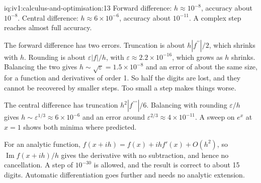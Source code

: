 \begin{solution}{iq:iv1:calculus-and-optimisation:13}
Forward difference: $h \approx 10^{-8}$, accuracy about $10^{-8}$. Central difference: $h \approx 6 \times 10^{-6}$, accuracy about $10^{-11}$. A complex step reaches almost full accuracy.

The forward difference has two errors. Truncation is about $h|f^{\prime\prime}|/2$, which shrinks with $h$. Rounding is about $\varepsilon|f|/h$, with $\varepsilon \approx 2.2 \times 10^{-16}$, which grows as $h$ shrinks. Balancing the two gives $h \sim \sqrt{\varepsilon} = 1.5 \times 10^{-8}$ and an error of about the same size, for a function and derivatives of order 1. So half the digits are lost, and they cannot be recovered by smaller steps. Too small a step makes things worse.

The central difference has truncation $h^2|f^{\prime\prime\prime}|/6$. Balancing with rounding $\varepsilon/h$ gives $h \sim \varepsilon^{1/3} \approx 6 \times 10^{-6}$ and an error around $\varepsilon^{2/3} \approx 4 \times 10^{-11}$. A sweep on $e^x$ at $x = 1$ shows both minima where predicted.

For an analytic function, $f(x + ih) = f(x) + ihf'(x) + O(h^2)$, so $\operatorname{Im} f(x + ih)/h$ gives the derivative with no subtraction, and hence no cancellation. A step of $10^{-30}$ is allowed, and the result is correct to about 15 digits. Automatic differentiation goes further and needs no analytic extension.



\end{solution}

